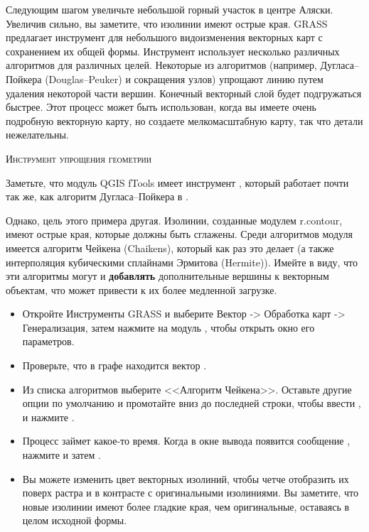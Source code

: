 Следующим шагом увеличьте небольшой горный участок в центре Аляски.
Увеличив сильно, вы заметите, что изолинии имеют острые края. GRASS
предлагает инструмент  для небольшого
видоизменения векторных карт с сохранением их общей формы. Инструмент
использует несколько различных алгоритмов для различных целей. Некоторые
из алгоритмов (например, Дугласа--Пойкера (Douglas--Peuker) и сокращения
узлов) упрощают линию путем удаления некоторой части вершин. Конечный
векторный слой будет подгружаться быстрее. Этот процесс может быть
использован, когда вы имеете очень подробную векторную карту, но
создаете мелкомасштабную карту, так что детали нежелательны.

\begin{Tip}\caption{\textsc{Инструмент упрощения геометрии}}
Заметьте, что модуль QGIS fTools имеет инструмент
, который работает почти так же, как алгоритм
Дугласа--Пойкера в .
\end{Tip}

Однако, цель этого примера другая. Изолинии, созданные модулем
r.contour, имеют острые края, которые должны быть сглажены. Среди
алгоритмов модуля  имеется алгоритм Чейкена
(Chaikens), который как раз это делает (а также интерполяция кубическими
сплайнами Эрмитова (Hermite)). Имейте в виду, что эти алгоритмы могут и
\textbf{добавлять} дополнительные вершины к векторным объектам, что
может привести к их более медленной загрузке.

\begin{itemize}[label=--]
\item Откройте Инструменты GRASS и выберите Вектор -> Обработка карт ->
Генерализация, затем нажмите на модуль , чтобы
открыть окно его параметров.
\item Проверьте, что в графе
 находится
вектор .
\item Из списка алгоритмов выберите <<Алгоритм Чейкена>>. Оставьте
другие опции по умолчанию и промотайте вниз до последней строки, чтобы
ввести ,
и нажмите .
\item Процесс займет какое-то время. Когда в окне вывода появится
сообщение , нажмите 
и затем .
\item Вы можете изменить цвет векторных изолиний, чтобы четче отобразить
их поверх растра и в контрасте с оригинальными изолиниями. Вы заметите,
что новые изолинии имеют более гладкие края, чем оригинальные, оставаясь
в целом исходной формы.
\end{itemize}

